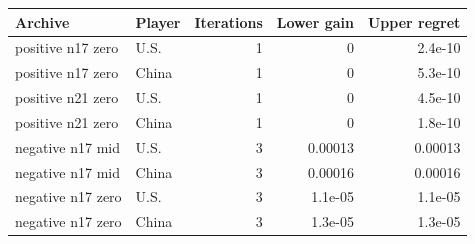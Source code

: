 \begin{tabular}{llrrr}\toprule
Archive & Player & Iterations & Lower gain & Upper regret \\\midrule
positive n17 zero & U.S. & 1 & 0 & 2.4e-10 \\
positive n17 zero & China & 1 & 0 & 5.3e-10 \\
positive n21 zero & U.S. & 1 & 0 & 4.5e-10 \\
positive n21 zero & China & 1 & 0 & 1.8e-10 \\
negative n17 mid & U.S. & 3 & 0.00013 & 0.00013 \\
negative n17 mid & China & 3 & 0.00016 & 0.00016 \\
negative n17 zero & U.S. & 3 & 1.1e-05 & 1.1e-05 \\
negative n17 zero & China & 3 & 1.3e-05 & 1.3e-05 \\
\bottomrule\end{tabular}
